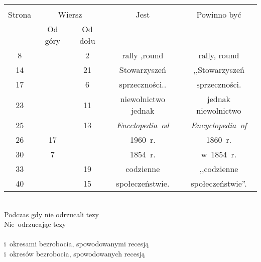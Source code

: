 \documentclass[a4paper,11pt]{article}
\begin{document}
\begin{center}
  \begin{tabular}{|c|c|c|c|c|}
    \hline
    & \multicolumn{2}{c|}{} & & \\
    Strona & \multicolumn{2}{c|}{Wiersz} & Jest
                              & Powinno być \\ \cline{2-3}
    & Od góry & Od dołu & & \\
    \hline
    8   & &  2 & rally ,round & rally, round \\
    14  & & 21 & Stowarzyszeń & ,,Stowarzyszeń  %
    \\
    17  & &  6 & sprzeczności.. & sprzeczności. \\
    23  & & 11 & niewolnictwo jednak & jednak niewolnictwo \\
    25  & & 13 & \emph{Encclopedia~od} & \emph{Encyclopedia~of} \\
    26  & 17 & & 1960~r. & 1860~r. \\
    30  &  7 & & 1854~r. & w~1854~r. \\
    33  & & 19 & codzienne & ,,codzienne  %
    \\
    40  & & 15 & społeczeństwie. & społeczeństwie''. \\
    \hline
  \end{tabular}
\end{center}
\noi
{} \\
\Jest Podczas gdy nie odrzucali tezy \\
\Pow  Nie~odrzucając tezy \\
 \\
\Jest i~okresami bezrobocia, spowodowanymi recesją \\
\Pow  i~okresów bezrobocia, spowodowanych recesją \\

\vspace{\spaceTwo}
\end{document}
